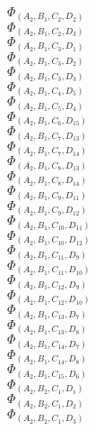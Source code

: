 \documentclass[14pt]{article}
\begin{document}
    $\Phi_{({A}_{2}, {B}_{1}, {C}_{2}, {D}_{2})}$ \\ 
    $\Phi_{({A}_{2}, {B}_{1}, {C}_{2}, {D}_{3})}$ \\ 
    $\Phi_{({A}_{2}, {B}_{1}, {C}_{3}, {D}_{1})}$ \\ 
    $\Phi_{({A}_{2}, {B}_{1}, {C}_{3}, {D}_{2})}$ \\ 
    $\Phi_{({A}_{2}, {B}_{1}, {C}_{3}, {D}_{3})}$ \\ 
    $\Phi_{({A}_{2}, {B}_{1}, {C}_{4}, {D}_{5})}$ \\ 
    $\Phi_{({A}_{2}, {B}_{1}, {C}_{5}, {D}_{4})}$ \\ 
    $\Phi_{({A}_{2}, {B}_{1}, {C}_{6}, {D}_{15})}$ \\ 
    $\Phi_{({A}_{2}, {B}_{1}, {C}_{7}, {D}_{13})}$ \\ 
    $\Phi_{({A}_{2}, {B}_{1}, {C}_{7}, {D}_{14})}$ \\ 
    $\Phi_{({A}_{2}, {B}_{1}, {C}_{8}, {D}_{13})}$ \\ 
    $\Phi_{({A}_{2}, {B}_{1}, {C}_{8}, {D}_{14})}$ \\ 
    $\Phi_{({A}_{2}, {B}_{1}, {C}_{9}, {D}_{11})}$ \\ 
    $\Phi_{({A}_{2}, {B}_{1}, {C}_{9}, {D}_{12})}$ \\ 
    $\Phi_{({A}_{2}, {B}_{1}, {C}_{10}, {D}_{11})}$ \\ 
    $\Phi_{({A}_{2}, {B}_{1}, {C}_{10}, {D}_{12})}$ \\ 
    $\Phi_{({A}_{2}, {B}_{1}, {C}_{11}, {D}_{9})}$ \\ 
    $\Phi_{({A}_{2}, {B}_{1}, {C}_{11}, {D}_{10})}$ \\ 
    $\Phi_{({A}_{2}, {B}_{1}, {C}_{12}, {D}_{9})}$ \\ 
    $\Phi_{({A}_{2}, {B}_{1}, {C}_{12}, {D}_{10})}$ \\ 
    $\Phi_{({A}_{2}, {B}_{1}, {C}_{13}, {D}_{7})}$ \\ 
    $\Phi_{({A}_{2}, {B}_{1}, {C}_{13}, {D}_{8})}$ \\ 
    $\Phi_{({A}_{2}, {B}_{1}, {C}_{14}, {D}_{7})}$ \\ 
    $\Phi_{({A}_{2}, {B}_{1}, {C}_{14}, {D}_{8})}$ \\ 
    $\Phi_{({A}_{2}, {B}_{1}, {C}_{15}, {D}_{6})}$ \\ 
    $\Phi_{({A}_{2}, {B}_{2}, {C}_{1}, {D}_{1})}$ \\ 
    $\Phi_{({A}_{2}, {B}_{2}, {C}_{1}, {D}_{2})}$ \\ 
    $\Phi_{({A}_{2}, {B}_{2}, {C}_{1}, {D}_{3})}$ \\ 
\end{document}
